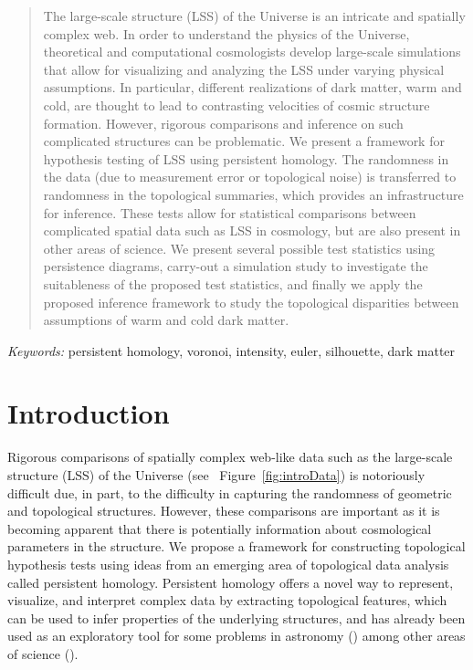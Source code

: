 \documentclass[12pt]{article}
\newcommand{\figref}[1]{Figure~\ref{#1}}
\begin{document}
\bigskip
\begin{abstract}
The large-scale structure (LSS) of the Universe is an intricate and spatially complex web. In order to understand the physics of the Universe, theoretical and computational cosmologists develop large-scale simulations that allow for visualizing and analyzing the LSS under varying physical assumptions. In particular, different realizations of dark matter, warm and cold, are thought to lead to contrasting velocities of cosmic structure formation. However, rigorous comparisons and inference on such complicated structures can be problematic.  We present a framework for hypothesis testing of LSS using persistent homology. The randomness in the data (due to measurement error or topological noise) is transferred to randomness in the topological summaries, which provides an infrastructure for inference. These tests allow for statistical comparisons between complicated spatial data such as LSS in cosmology, but are also present in other areas of science. We present several possible test statistics using persistence diagrams, carry-out a simulation study to investigate the suitableness of the proposed test statistics, and finally we apply the proposed inference framework to study the topological disparities between assumptions of warm and cold dark matter.
\end{abstract}

\noindent%
{\it Keywords:} persistent homology, voronoi, intensity, euler, silhouette, dark matter
\vfill


\newpage
{} %
\section{Introduction}
\label{sec:intro}

Rigorous comparisons of spatially complex web-like data such as the large-scale structure (LSS) of the Universe (see ~\figref{fig:introData}) is notoriously difficult due, in part, to the difficulty in capturing the randomness of geometric and topological structures.  However, these comparisons are important as it is becoming apparent that there is potentially information about cosmological parameters in the structure. We propose a framework for constructing topological hypothesis tests using ideas from an emerging area of topological data analysis called persistent homology. Persistent homology offers a novel way to represent, visualize, and interpret complex data by extracting topological features, which can be used to infer properties of the underlying structures, and has already been used as an exploratory tool for some problems in astronomy (\cite{cisewski2014non, van2011alpha}) among other areas of science (\cite{bendich2014persistent, duong2012closed}).
\end{document}
